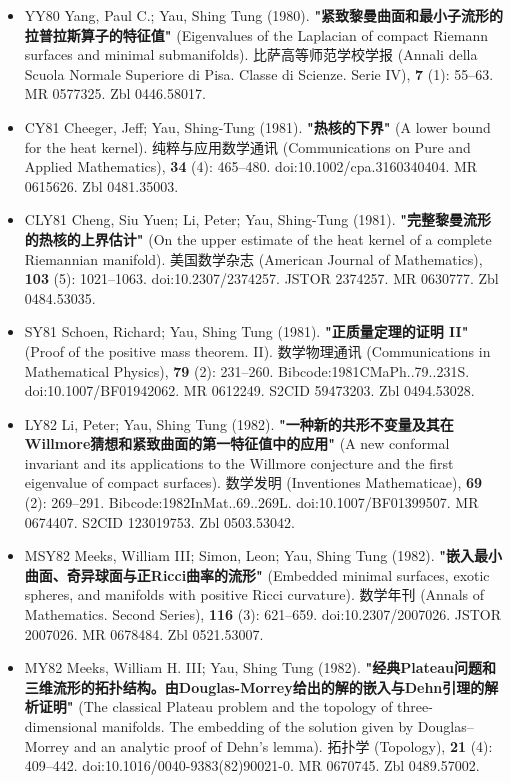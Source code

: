 \begin{itemize}
\item YY80  Yang, Paul C.; Yau, Shing Tung (1980). \textbf{"紧致黎曼曲面和最小子流形的拉普拉斯算子的特征值"} (Eigenvalues of the Laplacian of compact Riemann surfaces and minimal submanifolds). 比萨高等师范学校学报 (Annali della Scuola Normale Superiore di Pisa. Classe di Scienze. Serie IV), \textbf{7} (1): 55–63. MR 0577325. Zbl 0446.58017.
\item CY81 Cheeger, Jeff; Yau, Shing-Tung (1981). \textbf{"热核的下界"} (A lower bound for the heat kernel). 纯粹与应用数学通讯 (Communications on Pure and Applied Mathematics), \textbf{34} (4): 465–480. doi:10.1002/cpa.3160340404. MR 0615626. Zbl 0481.35003.
\item CLY81 Cheng, Siu Yuen; Li, Peter; Yau, Shing-Tung (1981). \textbf{"完整黎曼流形的热核的上界估计"} (On the upper estimate of the heat kernel of a complete Riemannian manifold). 美国数学杂志 (American Journal of Mathematics), \textbf{103} (5): 1021–1063. doi:10.2307/2374257. JSTOR 2374257. MR 0630777. Zbl 0484.53035.
\item SY81 Schoen, Richard; Yau, Shing Tung (1981). \textbf{"正质量定理的证明 II"} (Proof of the positive mass theorem. II). 数学物理通讯 (Communications in Mathematical Physics), \textbf{79} (2): 231–260. Bibcode:1981CMaPh..79..231S. doi:10.1007/BF01942062. MR 0612249. S2CID 59473203. Zbl 0494.53028.
\item LY82 Li, Peter; Yau, Shing Tung (1982). \textbf{"一种新的共形不变量及其在Willmore猜想和紧致曲面的第一特征值中的应用"} (A new conformal invariant and its applications to the Willmore conjecture and the first eigenvalue of compact surfaces). 数学发明 (Inventiones Mathematicae), \textbf{69} (2): 269–291. Bibcode:1982InMat..69..269L. doi:10.1007/BF01399507. MR 0674407. S2CID 123019753. Zbl 0503.53042.
\item MSY82 Meeks, William III; Simon, Leon; Yau, Shing Tung (1982). \textbf{"嵌入最小曲面、奇异球面与正Ricci曲率的流形"} (Embedded minimal surfaces, exotic spheres, and manifolds with positive Ricci curvature). 数学年刊 (Annals of Mathematics. Second Series), \textbf{116} (3): 621–659. doi:10.2307/2007026. JSTOR 2007026. MR 0678484. Zbl 0521.53007.
\item MY82 Meeks, William H. III; Yau, Shing Tung (1982). \textbf{"经典Plateau问题和三维流形的拓扑结构。由Douglas-Morrey给出的解的嵌入与Dehn引理的解析证明"} (The classical Plateau problem and the topology of three-dimensional manifolds. The embedding of the solution given by Douglas–Morrey and an analytic proof of Dehn's lemma). 拓扑学 (Topology), \textbf{21} (4): 409–442. doi:10.1016/0040-9383(82)90021-0. MR 0670745. Zbl 0489.57002.

\end{itemize}

